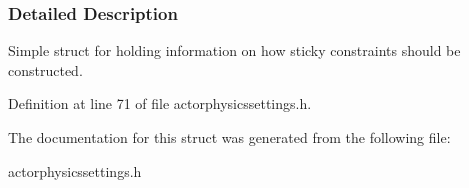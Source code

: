 \subsubsection{Detailed Description}
Simple struct for holding information on how sticky constraints should be constructed. 

Definition at line 71 of file actorphysicssettings.h.



The documentation for this struct was generated from the following file:\begin{DoxyCompactItemize}
\item 
actorphysicssettings.h\end{DoxyCompactItemize}
